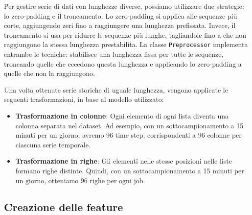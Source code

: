 Per gestire serie di dati con lunghezze diverse, possiamo utilizzare due
strategie: lo zero-padding e il troncamento. Lo zero-padding si applica alle
sequenze più corte, aggiungendo zeri fino a raggiungere una lunghezza
prefissata. Invece, il troncamento si usa per ridurre le sequenze più lunghe,
tagliandole fino a che non raggiungono la stessa lunghezza prestabilita. La
classe \texttt{Preprocessor} implementa entrambe le tecniche: stabilisce una
lunghezza fissa per tutte le sequenze, troncando quelle che eccedono questa
lunghezza e applicando lo zero-padding a quelle che non la raggiungono.

Una volta ottenute serie storiche di uguale lunghezza, vengono applicate le
seguenti trasformazioni, in base al modello utilizzato:

\begin{itemize}
    \item \textbf{Trasformazione in colonne}: Ogni elemento di ogni lista diventa una colonna
        separata nel dataset. Ad esempio, con un sottocampionamento a 15
        minuti per un giorno, avremo 96 time step, corrispondenti a 96 colonne
        per ciascuna serie temporale.
    \item \textbf{Trasformazione in righe}: 
        Gli elementi nelle stesse posizioni nelle liste formano righe
        distinte. Quindi, con un sottocampionamento a 15 minuti per un giorno,
        otteniamo 96 righe per ogni job.
\end{itemize}

\subsection{Creazione delle feature} %


\begin{figure}[!ht]
    \centering
    \hspace{2cm}
\end{figure}

